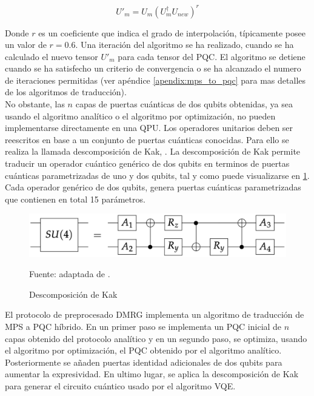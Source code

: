 \begin{equation}
    U'_{m} = U_{m}(U^{\dagger}_{m}U_{new})^{r}
    \label{eq:interpolation}
\end{equation}

Donde $r$ es un coeficiente que indica el grado de interpolación, típicamente posee un valor de $r=0.6$. Una iteración del algoritmo se ha realizado, cuando se ha calculado el nuevo tensor $U'_{m}$ para cada tensor del PQC. El algoritmo se detiene cuando se ha satisfecho un criterio de convergencia o se ha alcanzado el numero de iteraciones permitidas (ver apéndice \ref{apendix:mps_to_pqc} para mas detalles de los algoritmos de traducción). \\

No obstante, las $n$ capas de puertas cuánticas de dos qubits obtenidas, ya sea usando el algoritmo analítico o el algoritmo por optimización, no pueden implementarse directamente en una QPU. Los operadores unitarios deben ser reescritos en base a un conjunto de puertas cuánticas conocidas. Para ello se realiza la llamada descomposición de Kak, \citep{tucci}. La descomposición de Kak permite traducir un operador cuántico genérico de dos qubits en terminos de puertas cuánticas parametrizadas de uno y dos qubits, tal y como puede visualizarse en \ref{fig:kak_decomposition}. Cada operador genérico de dos qubits, genera puertas cuánticas parametrizadas que contienen en total 15 parámetros. \\


\begin{figure}[!h]
    \centering
    \includegraphics[scale = 0.15]{img/05-kak_decomposition.png}
    \caption{Descomposición de Kak}
    Fuente: adaptada de \citep{cenedese}.
    \label{fig:kak_decomposition}
\end{figure}

El protocolo de preprocesado DMRG implementa un algoritmo de traducción de MPS a PQC híbrido. En un primer paso se implementa un PQC inicial de $n$ capas obtenido del protocolo analítico y en un segundo paso, se optimiza, usando el algoritmo por optimización, el PQC obtenido por el algoritmo analítico. Posteriormente se añaden puertas identidad adicionales de dos qubits para aumentar la expresividad. En ultimo lugar, se aplica la descomposición de Kak para generar el circuito cuántico usado por el algoritmo VQE. \\



